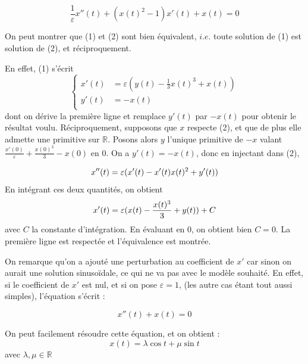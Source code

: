 \documentclass{article}
\begin{document}
\begin{equation}
    \frac{1}{\varepsilon} x''(t) + (x(t)^2 -1)x'(t) + x(t) = 0
\end{equation}

On peut montrer que (1) et (2) sont bien équivalent, $i.e.$ toute solution de (1) est solution de (2), et réciproquement.

En effet, (1) s'écrit
\begin{equation*}
    \left\{
    \begin{aligned}
        x'(t) &= \varepsilon (y(t) - \frac{1}{3} x(t)^3 + x(t)) \\   
        y'(t) &= -x(t)\\
   \end{aligned}
   \right.
\end{equation*}
dont on dérive la première ligne et remplace \(y'(t) \) par \( -x(t) \) pour obtenir le résultat voulu.
Réciproquement, supposons que \(x\) respecte (2), et que de plus elle admette une primitive sur $\mathbb{R}$. Posons alors $y$ l'unique primitive de $-x$ valant $\frac{x'(0)}{\varepsilon} 
+ \frac{x(0)^3}{3} - x(0)$ en $0$.
On a $y'(t) = -x(t)$, donc en injectant dans (2),

\begin{equation*}
    x''(t) = \varepsilon (x'(t) - x'(t)x(t)^2 + y'(t)) \\
\end{equation*}
En intégrant ces deux quantités, on obtient
\begin{equation*}
    x'(t) = \varepsilon (x(t) - \frac{x(t)^3}{3} + y(t)) + C \\
\end{equation*}
avec $C$ la constante d'intégration. En évaluant en 0, on obtient bien $C = 0$. La première ligne est respectée et l'équivalence est montrée.

\medskip

On remarque qu'on a ajouté une perturbation au coefficient de $x'$ car sinon on aurait une solution sinusoïdale, ce qui ne va pas avec le modèle souhaité. En effet, si le coefficient de $x'$ est nul, et si on pose $\varepsilon = 1$, (les autre cas étant tout aussi simples), l'équation s'écrit :

\begin{equation*}
    x''(t) + x(t) = 0
\end{equation*}

On peut facilement résoudre cette équation, et on obtient :
\[ x(t) = \lambda \cos t + \mu \sin t\]
avec $\lambda ,\mu \in \mathbb{R}$
\end{document}
